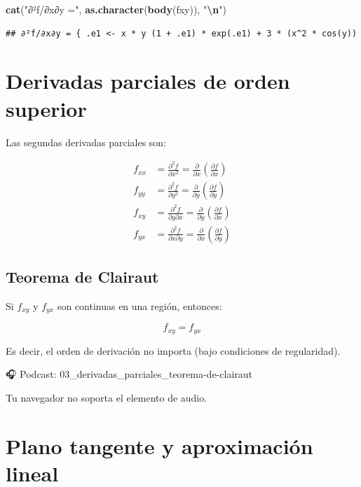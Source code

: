 \documentclass[
]{book}
\newenvironment{Shaded}{\begin{snugshade}}{\end{snugshade}}
\newcommand{\FunctionTok}[1]{\textcolor[rgb]{0.13,0.29,0.53}{\textbf{#1}}}
\newcommand{\NormalTok}[1]{#1}
\newcommand{\SpecialCharTok}[1]{\textcolor[rgb]{0.81,0.36,0.00}{\textbf{#1}}}
\newcommand{\StringTok}[1]{\textcolor[rgb]{0.31,0.60,0.02}{#1}}
\begin{document}
\begin{Shaded}
\begin{Highlighting}[]
\FunctionTok{cat}\NormalTok{(}\StringTok{"∂²f/∂x∂y ="}\NormalTok{, }\FunctionTok{as.character}\NormalTok{(}\FunctionTok{body}\NormalTok{(fxy)), }\StringTok{"}\SpecialCharTok{\textbackslash{}n}\StringTok{"}\NormalTok{)}
\end{Highlighting}
\end{Shaded}

\begin{verbatim}
## ∂²f/∂x∂y = { .e1 <- x * y (1 + .e1) * exp(.e1) + 3 * (x^2 * cos(y))
\end{verbatim}

\section{Derivadas parciales de orden superior}\label{derivadas-parciales-de-orden-superior}

Las segundas derivadas parciales son:

\[
\begin{aligned}
f_{xx} &= \frac{\partial^2 f}{\partial x^2} = \frac{\partial}{\partial x}\left(\frac{\partial f}{\partial x}\right) \\
f_{yy} &= \frac{\partial^2 f}{\partial y^2} = \frac{\partial}{\partial y}\left(\frac{\partial f}{\partial y}\right) \\
f_{xy} &= \frac{\partial^2 f}{\partial y \partial x} = \frac{\partial}{\partial y}\left(\frac{\partial f}{\partial x}\right) \\
f_{yx} &= \frac{\partial^2 f}{\partial x \partial y} = \frac{\partial}{\partial x}\left(\frac{\partial f}{\partial y}\right)
\end{aligned}
\]

\subsection{Teorema de Clairaut}\label{teorema-de-clairaut}

Si \(f_{xy}\) y \(f_{yx}\) son continuas en una región, entonces:

\[
f_{xy} = f_{yx}
\]

Es decir, el orden de derivación no importa (bajo condiciones de regularidad).

🎧 Podcast: 03\_derivadas\_parciales\_teorema-de-clairaut

Tu navegador no soporta el elemento de audio.

\section{Plano tangente y aproximación lineal}\label{plano-tangente-y-aproximaciuxf3n-lineal}
\end{document}
